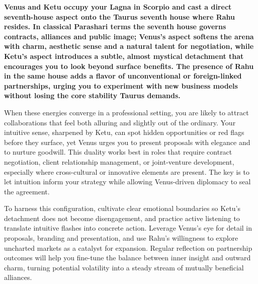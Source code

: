 
\label{topic19}

{\fontsize{9.5}{13.8}\selectfont\bfseries\color{DeepSlate} Venus and Ketu occupy your Lagna in Scorpio and cast a direct seventh-house aspect onto the Taurus seventh house where Rahu resides. In classical Parashari terms the seventh house governs contracts, alliances and public image; Venus's aspect softens the arena with charm, aesthetic sense and a natural talent for negotiation, while Ketu's aspect introduces a subtle, almost mystical detachment that encourages you to look beyond surface benefits. The presence of Rahu in the same house adds a flavor of unconventional or foreign-linked partnerships, urging you to experiment with new business models without losing the core stability Taurus demands.}\par\vspace{2mm}

{\fontsize{9}{13}\selectfont When these energies converge in a professional setting, you are likely to attract collaborations that feel both alluring and slightly out of the ordinary. Your intuitive sense, sharpened by Ketu, can spot hidden opportunities or red flags before they surface, yet Venus urges you to present proposals with elegance and to nurture goodwill. This duality works best in roles that require contract negotiation, client relationship management, or joint-venture development, especially where cross-cultural or innovative elements are present. The key is to let intuition inform your strategy while allowing Venus-driven diplomacy to seal the agreement.}\par\vspace{1.8mm}

{\fontsize{9}{13}\selectfont To harness this configuration, cultivate clear emotional boundaries so Ketu's detachment does not become disengagement, and practice active listening to translate intuitive flashes into concrete action. Leverage Venus's eye for detail in proposals, branding and presentation, and use Rahu's willingness to explore uncharted markets as a catalyst for expansion. Regular reflection on partnership outcomes will help you fine-tune the balance between inner insight and outward charm, turning potential volatility into a steady stream of mutually beneficial alliances.}\par\vspace{1.8mm}

